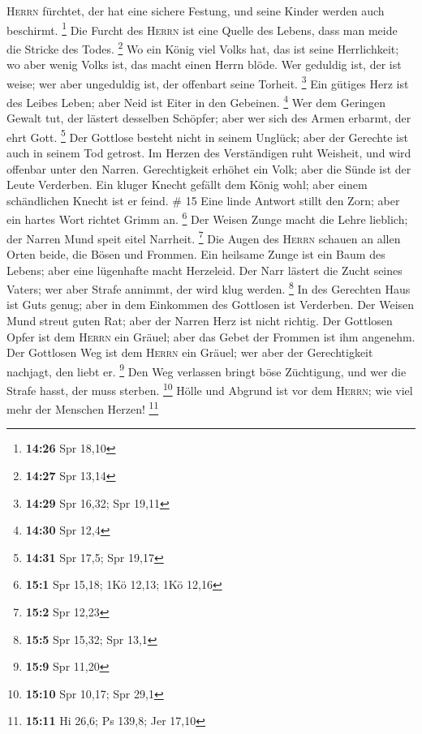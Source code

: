 \textsc{Herrn} fürchtet, der hat eine sichere Festung, und seine Kinder
werden auch beschirmt. \footnote{\textbf{14:26} Spr 18,10}
 Die Furcht des \textsc{Herrn} ist eine Quelle des
Lebens, dass man meide die Stricke des Todes. \footnote{\textbf{14:27}
  Spr 13,14}  Wo ein König viel Volks hat, das ist seine
Herrlichkeit; wo aber wenig Volks ist, das macht einen Herrn blöde.
 Wer geduldig ist, der ist weise; wer aber ungeduldig
ist, der offenbart seine Torheit. \footnote{\textbf{14:29} Spr 16,32;
  Spr 19,11}  Ein gütiges Herz ist des Leibes Leben; aber
Neid ist Eiter in den Gebeinen. \footnote{\textbf{14:30} Spr 12,4}
 Wer dem Geringen Gewalt tut, der lästert desselben
Schöpfer; aber wer sich des Armen erbarmt, der ehrt Gott. \footnote{\textbf{14:31}
  Spr 17,5; Spr 19,17}  Der Gottlose besteht nicht in
seinem Unglück; aber der Gerechte ist auch in seinem Tod getrost.
 Im Herzen des Verständigen ruht Weisheit, und wird
offenbar unter den Narren.  Gerechtigkeit erhöhet ein
Volk; aber die Sünde ist der Leute Verderben.  Ein kluger
Knecht gefällt dem König wohl; aber einem schändlichen Knecht ist er
feind. \# 15  Eine linde Antwort stillt den Zorn; aber ein
hartes Wort richtet Grimm an. \footnote{\textbf{15:1} Spr 15,18; 1Kö
  12,13; 1Kö 12,16}  Der Weisen Zunge macht die Lehre
lieblich; der Narren Mund speit eitel Narrheit. \footnote{\textbf{15:2}
  Spr 12,23}  Die Augen des \textsc{Herrn} schauen an
allen Orten beide, die Bösen und Frommen.  Ein heilsame
Zunge ist ein Baum des Lebens; aber eine lügenhafte macht Herzeleid.
 Der Narr lästert die Zucht seines Vaters; wer aber Strafe
annimmt, der wird klug werden. \footnote{\textbf{15:5} Spr 15,32; Spr
  13,1}  In des Gerechten Haus ist Guts genug; aber in dem
Einkommen des Gottlosen ist Verderben.  Der Weisen Mund
streut guten Rat; aber der Narren Herz ist nicht richtig. 
Der Gottlosen Opfer ist dem \textsc{Herrn} ein Gräuel; aber das Gebet
der Frommen ist ihm angenehm.  Der Gottlosen Weg ist dem
\textsc{Herrn} ein Gräuel; wer aber der Gerechtigkeit nachjagt, den
liebt er. \footnote{\textbf{15:9} Spr 11,20}  Den Weg
verlassen bringt böse Züchtigung, und wer die Strafe hasst, der muss
sterben. \footnote{\textbf{15:10} Spr 10,17; Spr 29,1} 
Hölle und Abgrund ist vor dem \textsc{Herrn}; wie viel mehr der Menschen
Herzen! \footnote{\textbf{15:11} Hi 26,6; Ps 139,8; Jer 17,10}
